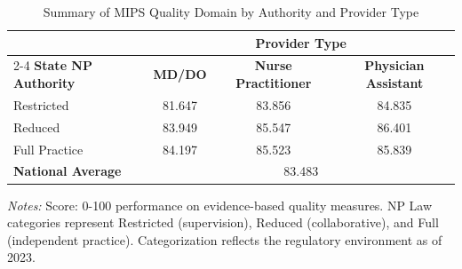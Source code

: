 \begin{table}[htbp]
    \centering
    \caption{Summary of MIPS Quality Domain by Authority and Provider Type}
    \label{tab:mips_quality_score_provtype}
    \vspace{0.2cm}
    \begin{tabular}{lccc}
        \toprule
        & \multicolumn{3}{c}{\textbf{Provider Type}} \\
        \cmidrule(lr){2-4}
        \textbf{State NP Authority} & \textbf{MD/DO} & \textbf{Nurse Practitioner} & \textbf{Physician Assistant} \\
        \midrule
        Restricted & 81.647 & 83.856 & 84.835 \\
        Reduced & 83.949 & 85.547 & 86.401 \\
        Full Practice & 84.197 & 85.523 & 85.839 \\
        \midrule
        \textbf{National Average} & \multicolumn{3}{c}{83.483} \\
        \bottomrule
    \end{tabular}
    \vspace{0.1cm}
    \begin{minipage}{0.85\textwidth}
        \footnotesize \textit{Notes:} Score: 0-100 performance on evidence-based quality measures. NP Law categories represent Restricted (supervision), Reduced (collaborative), and Full (independent practice). Categorization reflects the regulatory environment as of 2023.
    \end{minipage}
\end{table}